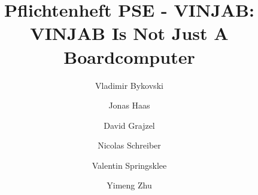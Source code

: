 \documentclass[a4paper]{scrreprt}
\begin{document}
\title{Pflichtenheft PSE - VINJAB: VINJAB Is Not Just A Boardcomputer}
\author{Vladimir Bykovski 
			\and Jonas Haas 
			\and David Grajzel 
			\and Nicolas Schreiber
			\and Valentin Springsklee
			\and Yimeng Zhu}




\maketitle

\newpage
\setcounter{page}{1} %


\tableofcontents

\newpage
{}
















\end{document}
